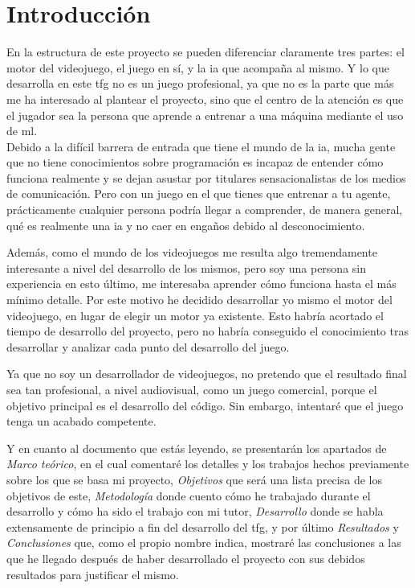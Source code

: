 
\chapter{Introducción}
\label{introduccion}
En la estructura de este proyecto se pueden diferenciar claramente tres partes: el motor del videojuego, el juego en sí, y la \gls{ia} que acompaña al mismo. Y lo que desarrolla en este \gls{tfg} no es un juego profesional, ya que no es la parte que más me ha interesado al plantear el proyecto, sino que el centro de la atención es que el jugador sea la persona que aprende a entrenar a una máquina mediante el uso de \gls{ml}.
\\
Debido a la difícil barrera de entrada que tiene el mundo de la \gls{ia}, mucha gente que no tiene conocimientos sobre programación es incapaz de entender cómo funciona realmente y se dejan asustar por titulares sensacionalistas de los medios de comunicación. Pero con un juego en el que tienes que entrenar a tu agente, prácticamente cualquier persona podría llegar a comprender, de manera general, qué es realmente una \gls{ia} y no caer en engaños debido al desconocimiento.

Además, como el mundo de los videojuegos me resulta algo tremendamente interesante a nivel del desarrollo de los mismos, pero soy una persona sin experiencia en esto último, me interesaba aprender cómo funciona hasta el más mínimo detalle. Por este motivo he decidido desarrollar yo mismo el motor del videojuego, en lugar de elegir un motor ya existente. Esto habría acortado el tiempo de desarrollo del proyecto, pero no habría conseguido el conocimiento tras desarrollar y analizar cada punto del desarrollo del juego.

Ya que no soy un desarrollador de videojuegos, no pretendo que el resultado final sea tan profesional, a nivel audiovisual, como un juego comercial, porque el objetivo principal es el desarrollo del código. Sin embargo, intentaré que el juego tenga un acabado competente. 

Y en cuanto al documento que estás leyendo, se presentarán los apartados de \textit{Marco teórico}, en el cual comentaré los detalles y los trabajos hechos previamente sobre los que se basa mi proyecto, \textit{Objetivos} que será una lista precisa de los objetivos de este, \textit{Metodología} donde cuento cómo he trabajado durante el desarrollo y cómo ha sido el trabajo con mi tutor, \textit{Desarrollo} donde se habla extensamente de principio a fin del desarrollo del \gls{tfg}, y por último \textit{Resultados} y \textit{Conclusiones} que, como el propio nombre indica, mostraré las conclusiones a las que he llegado después de haber desarrollado el proyecto con sus debidos resultados para justificar el mismo.

